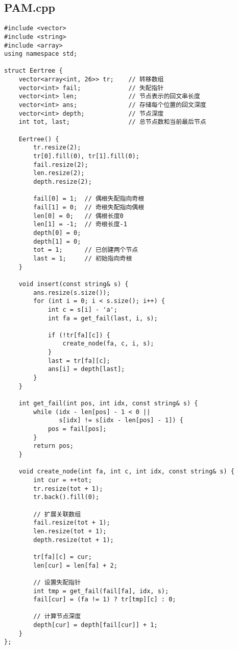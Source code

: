 \documentclass[UTF8, a4paper, titlepage, twoside]{ctexart}
\begin{document}
\subsection{PAM.cpp}
\begin{verbatim}
#include <vector>
#include <string>
#include <array>
using namespace std;

struct Eertree {
    vector<array<int, 26>> tr;    // 转移数组
    vector<int> fail;             // 失配指针
    vector<int> len;              // 节点表示的回文串长度
    vector<int> ans;              // 存储每个位置的回文深度
    vector<int> depth;            // 节点深度
    int tot, last;                // 总节点数和当前最后节点

    Eertree() {
        tr.resize(2);
        tr[0].fill(0), tr[1].fill(0);
        fail.resize(2);
        len.resize(2);
        depth.resize(2);
        
        fail[0] = 1;  // 偶根失配指向奇根
        fail[1] = 0;  // 奇根失配指向偶根
        len[0] = 0;   // 偶根长度0
        len[1] = -1;  // 奇根长度-1
        depth[0] = 0;
        depth[1] = 0;
        tot = 1;      // 已创建两个节点
        last = 1;     // 初始指向奇根
    }

    void insert(const string& s) {
        ans.resize(s.size());
        for (int i = 0; i < s.size(); i++) {
            int c = s[i] - 'a';
            int fa = get_fail(last, i, s);
            
            if (!tr[fa][c]) {
                create_node(fa, c, i, s);
            }
            last = tr[fa][c];
            ans[i] = depth[last];
        }
    }

    int get_fail(int pos, int idx, const string& s) {
        while (idx - len[pos] - 1 < 0 || 
               s[idx] != s[idx - len[pos] - 1]) {
            pos = fail[pos];
        }
        return pos;
    }

    void create_node(int fa, int c, int idx, const string& s) {
        int cur = ++tot;
        tr.resize(tot + 1);
        tr.back().fill(0);
        
        // 扩展关联数组
        fail.resize(tot + 1);
        len.resize(tot + 1);
        depth.resize(tot + 1);

        tr[fa][c] = cur;
        len[cur] = len[fa] + 2;
        
        // 设置失配指针
        int tmp = get_fail(fail[fa], idx, s);
        fail[cur] = (fa != 1) ? tr[tmp][c] : 0;
        
        // 计算节点深度
        depth[cur] = depth[fail[cur]] + 1;
    }
};
\end{verbatim}
\end{document}
